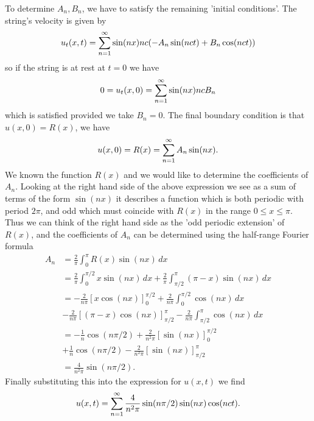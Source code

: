 \documentclass[10pt, a4paper]{article}
\begin{document}
\begin{example}
\begin{solution}
        To determine $A_n, B_n$,
        we have to satisfy the remaining 'initial conditions'.
        The string's velocity is given by
        \[
        u_t(x, t) = \infsum[n = 1]\sin(nx)nc(-A_n\sin(nct) + B_n\cos(nct))
        \]
        so if the string is at rest at $t = 0$ we have
        \[
        0 = u_t(x, 0) = \infsum[n = 1]\sin(nx)ncB_n
        \]
        which is satisfied provided we take $B_n = 0$.
        The final boundary condition is that $u(x, 0) = R(x)$,
        we have
        \[
        u(x, 0) = R(x) = \infsum[n = 1]A_n\sin(nx).
        \]
        We known the function $R(x)$ and we would like to determine the coefficients of $A_n$.
        Looking at the right hand side of the above expression we see as a sum of terms of the form $\sin(nx)$ it describes a function which is both periodic with period $2\pi$,
        and odd which must coincide with $R(x)$ in the range $0 \leq x \leq \pi$.
        Thus we can think of the right hand side as the 'odd periodic extension' of $R(x)$,
        and the coefficients of $A_n$ can be determined using the half-range Fourier formula
        \begin{align*}
            A_n &= \frac{2}{\pi}\int_{0}^{\pi}R(x)\sin(nx)\,dx \\
            &= \frac{2}{\pi}\int_{0}^{\pi / 2}x\sin(nx)\,dx + \frac{2}{\pi}\int_{\pi / 2}^{\pi}(\pi - x)\sin(nx)\,dx \\
            &= -\frac{2}{n\pi}\left[x\cos(nx)\right]_{0}^{\pi / 2} + \frac{2}{n\pi}\int_{0}^{\pi / 2}\cos(nx)\,dx \\
            &-\frac{2}{n\pi}\left[(\pi - x)\cos(nx)\right]_{\pi / 2}^{\pi} - \frac{2}{n\pi}\int_{\pi / 2}^{\pi}\cos(nx)\,dx \\
            &= -\frac{1}{n}\cos(n\pi / 2) + \frac{2}{n ^ 2\pi}[\sin(nx)]_{0}^{\pi / 2} \\
            &+ \frac{1}{n}\cos(n\pi / 2) - \frac{2}{n ^ 2\pi}[\sin(nx)]_{\pi / 2}^{\pi} \\
            &= \frac{4}{n ^ 2\pi}\sin(n\pi / 2).
        \end{align*}
        Finally substituting this into the expression for $u(x, t)$ we find
        \[
        u(x, t) = \infsum[n = 1]\frac{4}{n ^ 2\pi}\sin(n\pi / 2)\sin(nx)\cos(nct).
        \]
    \end{solution}
\end{example}
\end{document}
